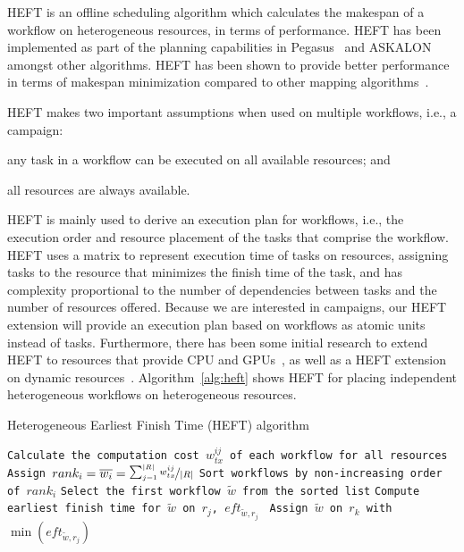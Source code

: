 HEFT is an offline scheduling algorithm which calculates the makespan of a workflow on heterogeneous resources, in terms of performance.
HEFT has been implemented as part of the planning capabilities in Pegasus~\cite{deelman2015pegasus} and ASKALON~\cite{fahringer2005askalon} amongst other algorithms.
HEFT has been shown to provide better performance in terms of makespan minimization compared to other mapping algorithms~\cite{topcuoglu2002performance,fahringer2005askalon,canon2008comparative}. 

HEFT makes two important assumptions when used on multiple workflows, i.e., a campaign: 
\begin{inparaenum}[(1)] 
    \item any task in a workflow can be executed on all available resources; and 
    \item all resources are always available.
\end{inparaenum}
HEFT is mainly used to derive an execution plan for workflows, i.e., the execution order and resource placement of the tasks that comprise the workflow.
HEFT uses a matrix to represent execution time of tasks on resources, assigning tasks to the resource that minimizes the finish time of the task, and has complexity proportional to the number of dependencies between tasks and the number of resources offered. 
Because we are interested in campaigns, our HEFT extension will provide an execution plan based on workflows as atomic units instead of tasks.
Furthermore, there has been some initial research to extend HEFT to resources that provide CPU and GPUs~\cite{shetti2013optimization}, as well as a HEFT extension on dynamic resources~\cite{dong2007pfas}. 
Algorithm~\ref{alg:heft} shows HEFT for placing independent heterogeneous workflows on heterogeneous resources.

\begin{algorithm}[ht]
    \caption{Heterogeneous Earliest Finish Time (HEFT) algorithm}
    \label{alg:heft}
    \begin{algorithmic}[1]
        \State \texttt{Calculate the computation cost $w_{tx}^{ij}$ of each workflow for all resources}
        \State \texttt{Assign $rank_i = \overline{w_{i}} = \nicefrac{\sum_{j=1}^{|R|}w_{tx}^{ij}}{|R|}$}
        \State \texttt{Sort workflows by non-increasing order of $rank_i$}
        \State \texttt{Select the first workflow $\tilde{w}$ from the sorted list}
        \State\texttt{Compute earliest finish time for $\tilde{w}$ on $r_{j}$, $eft_{\tilde{w},r_j}$ }
        \EndFor
        \State \texttt{Assign  $\tilde{w}$ on $r_k$ with $\min{(eft_{\tilde{w},r_j})}$}
        \EndWhile
        \EndProcedure
    \end{algorithmic}
\end{algorithm}

